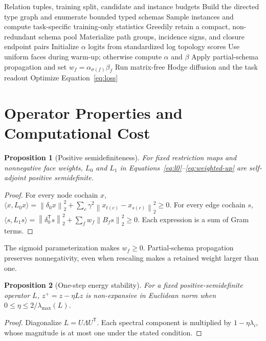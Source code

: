 \documentclass{article}
\newcommand{\ampss}{\textsc{AMPSS}}
\newcommand{\norm}[1]{\left\lVert #1\right\rVert}
\newcommand{\transpose}{\mathsf{T}}
\newtheorem{proposition}{Proposition}
\begin{document}
\begin{algorithm}[t]
  \caption{\ampss{} preprocessing and refinement}
  \label{alg:ampss}
  \begin{algorithmic}[1]
    \Require Relation tuples, training split, candidate and instance budgets
    \State Build the directed type graph and enumerate bounded typed schemas
    \State Sample instances and compute task-specific training-only statistics
    \State Greedily retain a compact, non-redundant schema pool
    \State Materialize path groups, incidence signs, and closure endpoint pairs
    \State Initialize $\alpha$ logits from standardized log topology scores
      \State Use uniform faces during warm-up; otherwise compute $\alpha$ and $\beta$
      \State Apply partial-schema propagation and set $w_f=\alpha_{\sigma(f)}\beta_f$
      \State Run matrix-free Hodge diffusion and the task readout
      \State Optimize Equation~\ref{eq:loss}
    \EndFor
  \end{algorithmic}
\end{algorithm}

\section{Operator Properties and Computational Cost}
\label{sec:analysis}

\begin{proposition}[Positive semidefiniteness]
For fixed restriction maps and nonnegative face weights, $L_0$ and $L_1$ in
Equations~\ref{eq:l0}--\ref{eq:weighted-up} are self-adjoint positive semidefinite.
\end{proposition}
\begin{proof}
For every node cochain $x$,
$\langle x,L_0x\rangle=\norm{\delta_0x}_2^2+
\sum_c\gamma^2\norm{x_{t(c)}-x_{s(c)}}_2^2\geq0$.
For every edge cochain $s$,
$\langle s,L_1s\rangle=\norm{\delta_0^{\transpose}s}_2^2+
\sum_f w_f\norm{B_f s}_2^2\geq0$. Each expression is a sum of Gram terms.
\end{proof}

The sigmoid parameterization makes $w_f\geq0$. Partial-schema propagation preserves
nonnegativity, even when rescaling makes a retained weight larger than one.

\begin{proposition}[One-step energy stability]
For a fixed positive-semidefinite operator $L$, $z^+=z-\eta Lz$ is non-expansive in Euclidean norm
when $0\leq\eta\leq2/\lambda_{\max}(L)$.
\end{proposition}
\begin{proof}
Diagonalize $L=U\Lambda U^{\transpose}$. Each spectral component is multiplied by
$1-\eta\lambda_i$, whose magnitude is at most one under the stated condition.
\end{proof}
\end{document}
